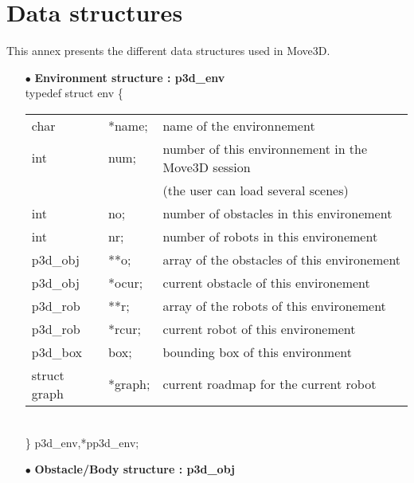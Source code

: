 \chapter{Data structures}
\label{datastruct}

This annex presents the different data structures used in Move3D.

\begin{itemize}

\item[$\bullet$]{\bf Environment structure : p3d\_env} \\

typedef struct env \{ \\ 
\begin{tabular}{l l l}
  char      & *name; & name of the environnement\\
  int       & num; & number of this environnement in the Move3D
session \\
            &      & (the user can load several scenes)\\
  int       & no; & number of obstacles in this environement\\
  int       & nr; & number of robots in this environement \\
  p3d\_obj  & **o; & array of the obstacles of this environement\\
  p3d\_obj  & *ocur; & current obstacle of this environement\\
  p3d\_rob  & **r; & array of the robots of this environement\\
  p3d\_rob  & *rcur;& current robot of this environement\\
  p3d\_box  & box; & bounding box of this environment\\
  struct graph & *graph; & current roadmap for the current robot\\ 
\end{tabular}\\
\} p3d\_env,*pp3d\_env; \\

\item[$\bullet$]{\bf Obstacle/Body structure : p3d\_obj} \\


\end{itemize}
